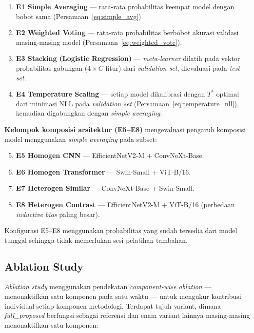 \begin{enumerate}[noitemsep]
    \item \textbf{E1 Simple Averaging} — rata-rata probabilitas keempat
    model dengan bobot sama (Persamaan~\ref{eq:simple_avg}).
    \item \textbf{E2 Weighted Voting} — rata-rata probabilitas berbobot
    akurasi validasi masing-masing model
    (Persamaan~\ref{eq:weighted_vote}).
    \item \textbf{E3 Stacking (Logistic Regression)} —
    \textit{meta-learner} dilatih pada vektor probabilitas gabungan
    ($4 \times C$ fitur) dari \textit{validation set}, dievaluasi pada
    \textit{test set}.
    \item \textbf{E4 Temperature Scaling} — setiap model dikalibrasi
    dengan $T^*$ optimal dari minimasi NLL pada \textit{validation set}
    (Persamaan~\ref{eq:temperature_nll}), kemudian digabungkan dengan
    \textit{simple averaging}.
\end{enumerate}

\textbf{Kelompok komposisi arsitektur (E5--E8)} mengevaluasi pengaruh
komposisi model menggunakan \textit{simple averaging} pada subset:

\begin{enumerate}[noitemsep]
    \setcounter{enumi}{4}
    \item \textbf{E5 Homogen CNN} — EfficientNetV2-M + ConvNeXt-Base.
    \item \textbf{E6 Homogen Transformer} — Swin-Small + ViT-B/16.
    \item \textbf{E7 Heterogen Similar} — ConvNeXt-Base + Swin-Small.
    \item \textbf{E8 Heterogen Contrast} — EfficientNetV2-M + ViT-B/16
    (perbedaan \textit{inductive bias} paling besar).
\end{enumerate}

Konfigurasi E5--E8 menggunakan probabilitas yang sudah tersedia dari
model tunggal sehingga tidak memerlukan sesi pelatihan tambahan. \par

\subsection{Ablation Study} \label{III.Langkah8}
\textit{Ablation study} menggunakan pendekatan \textit{component-wise
ablation} — menonaktifkan satu komponen pada satu waktu — untuk mengukur
kontribusi individual setiap komponen metodologi. Terdapat tujuh variant,
dimana \textit{full\_proposed} berfungsi sebagai referensi dan enam
variant lainnya masing-masing menonaktifkan satu komponen: \par

